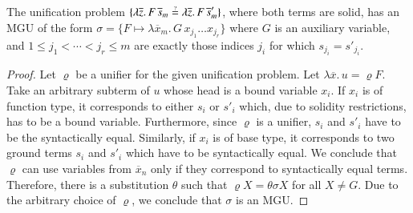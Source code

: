 \begin{lemma}
    \label{unif:lemma:solid-var-same-mgu}
    The unification problem 
    $\{\lambda \overline{z}.\, F\,\overline{s}_m \unif   \lambda \overline{z}.\, F\,\overline{s}'_{m}\}$, where both terms are
    solid, has an MGU of the form $\sigma=\{F \mapsto \lambda \overline{x}_m.\,
    G \, x_{j_1} \ldots x_{j_r}\}$ where $G$ is an auxiliary variable, and $1 \leq
    j_1 < \cdots < j_r \leq m$ are exactly those indices $j_i$ for which
    $s_{j_i} = s'_{j_i}$.
\end{lemma}
\begin{proof}
    Let $\varrho$ be a unifier for the given unification problem.
    Let $\lambda \overline{x}.\, u = \varrho F$. Take an arbitrary subterm of $u$ whose head is a bound
    variable $x_i$. If $x_i$ is of function type, it corresponds to either $s_i$
    or $s'_i$ which, due to solidity restrictions, has to be a bound variable.
    Furthermore, since $\varrho$ is a unifier, $s_i$ and $s'_i$ have to be the
    syntactically equal. Similarly, if $x_i$ is of base type, it corresponds
    to two ground terms $s_i$ and $s'_i$ which have to be syntactically equal.
    We conclude that $\varrho$ can use variables from $\overline{x}_n$ only
    if they correspond to syntactically equal terms. Therefore, 
    there is a substitution $\theta$ such that $\varrho X = \theta\sigma X$ for all $X \not = G$. 
    Due to the arbitrary choice of $\varrho$, we conclude that $\sigma$ is an MGU.
\end{proof}


